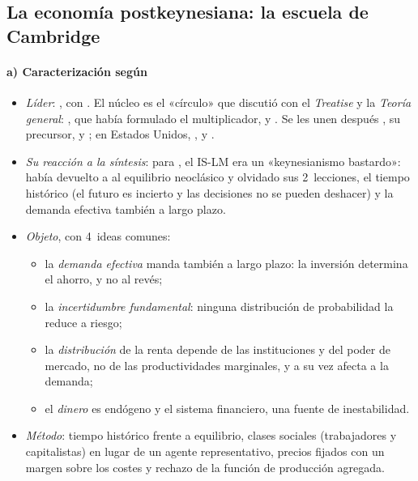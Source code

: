 \documentclass[11pt]{article}
\begin{document}
\subsection{La economía postkeynesiana: la escuela de Cambridge}\label{sec:postkeynesianos}

\paragraph{a) Caracterización según }

\begin{itemize}
\item \emph{Líder}: , con . El núcleo es el «círculo» que discutió con  el \emph{Treatise} y la \emph{Teoría general}: , que había formulado el multiplicador\nocite{Kahn1931Relation},  y . Se les unen después , su precursor, y ; en Estados Unidos, ,  y \nocite{King2002History}.
\item \emph{Su reacción a la síntesis}: para , el IS-LM era un «keynesianismo bastardo»\nocite{Robinson1962Review}: había devuelto a  al equilibrio neoclásico y olvidado sus 2~lecciones, el tiempo histórico (el futuro es incierto y las decisiones no se pueden deshacer) y la demanda efectiva también a largo plazo.
\item \emph{Objeto}, con 4~ideas comunes\nocite{Lavoie2014PostKeynesian}:
  \begin{itemize}
  \item la \emph{demanda efectiva} manda también a largo plazo: la inversión determina el ahorro, y no al revés;
  \item la \emph{incertidumbre fundamental}: ninguna distribución de probabilidad la reduce a riesgo;
  \item la \emph{distribución} de la renta depende de las instituciones y del poder de mercado, no de las productividades marginales, y a su vez afecta a la demanda;
  \item el \emph{dinero} es endógeno y el sistema financiero, una fuente de inestabilidad.
  \end{itemize}
\item \emph{Método}: tiempo histórico frente a equilibrio, clases sociales (trabajadores y capitalistas) en lugar de un agente representativo, precios fijados con un margen sobre los costes y rechazo de la función de producción agregada.
\end{itemize}
\end{document}
